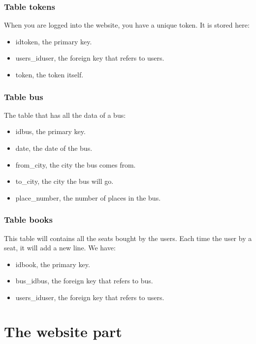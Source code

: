 \documentclass[12pt,a4paper,openany]{book}
\begin{document}
\subsubsection{Table tokens}
When you are logged into the website, you have a unique token. It is stored here:
\begin{itemize}
	\item idtoken, the primary key.
	\item users\_iduser, the foreign key that refers to users.
	\item token, the token itself.
\end{itemize}

\subsubsection{Table bus}
The table that has all the data of a bus:
\begin{itemize}
	\item idbus, the primary key.
	\item date, the date of the bus.
	\item from\_city, the city the bus comes from.
	\item to\_city, the city the bus will go.
	\item place\_number, the number of places in the bus.
\end{itemize}

\subsubsection{Table books}
This table will contains all the seats bought by the users. Each time the user by a seat, it will add a new line. We have:
\begin{itemize}
	\item idbook, the primary key.
	\item bus\_idbus, the foreign key that refers to bus.
	\item users\_iduser, the foreign key that refers to users.
\end{itemize}

\section{The website part}
\end{document}
